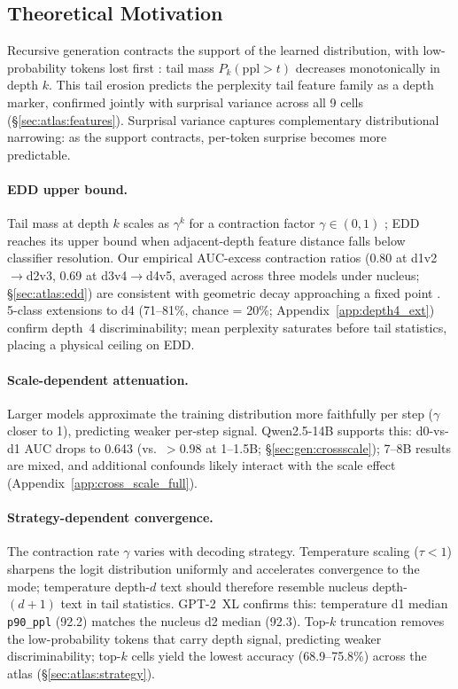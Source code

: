 \subsection{Theoretical Motivation}
\label{sec:method:theory}

Recursive generation contracts the support of the learned distribution, with low-probability tokens lost first \cite{shumailov2024_nature}: tail mass $P_k(\mathrm{ppl} > t)$ decreases monotonically in depth $k$.
This tail erosion predicts the perplexity tail feature family as a depth marker, confirmed jointly with surprisal variance across all 9 cells (\S\ref{sec:atlas:features}).
Surprisal variance captures complementary distributional narrowing: as the support contracts, per-token surprise becomes more predictable.

\paragraph{EDD upper bound.}
Tail mass at depth $k$ scales as $\gamma^k$ for a contraction factor $\gamma \in (0,1)$ \cite{dohmatob2024_tale_of_tails}; EDD reaches its upper bound when adjacent-depth feature distance falls below classifier resolution.
Our empirical AUC-excess contraction ratios (0.80 at d1v2$\to$d2v3, 0.69 at d3v4$\to$d4v5, averaged across three models under nucleus; \S\ref{sec:atlas:edd}) are consistent with geometric decay approaching a fixed point \cite{bertrand2024_stability}.
5-class extensions to d4 (71--81\%, chance = 20\%; Appendix~\ref{app:depth4_ext}) confirm depth~4 discriminability; mean perplexity saturates before tail statistics, placing a physical ceiling on EDD.

\paragraph{Scale-dependent attenuation.}
Larger models approximate the training distribution more faithfully per step ($\gamma$ closer to 1), predicting weaker per-step signal.
Qwen2.5-14B supports this: d0-vs-d1 AUC drops to 0.643 (vs.\ ${>}0.98$ at 1--1.5B; \S\ref{sec:gen:crossscale}); 7--8B results are mixed, and additional confounds likely interact with the scale effect (Appendix~\ref{app:cross_scale_full}).

\paragraph{Strategy-dependent convergence.}
The contraction rate $\gamma$ varies with decoding strategy.
Temperature scaling ($\tau < 1$) sharpens the logit distribution uniformly and accelerates convergence to the mode; temperature depth-$d$ text should therefore resemble nucleus depth-$(d{+}1)$ text in tail statistics.
GPT-2~XL confirms this: temperature d1 median \texttt{p90\_ppl} (92.2) matches the nucleus d2 median (92.3).
Top-$k$ truncation removes the low-probability tokens that carry depth signal, predicting weaker discriminability; top-$k$ cells yield the lowest accuracy (68.9--75.8\%) across the atlas (\S\ref{sec:atlas:strategy}).
